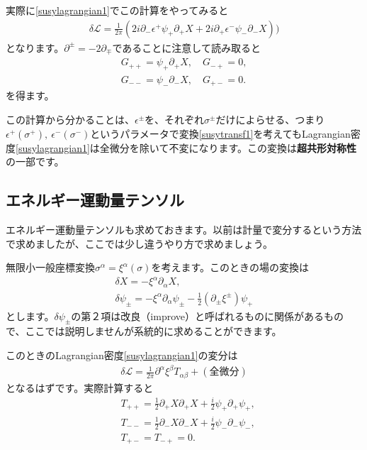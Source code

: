 \documentclass[report,paper=a4, fontsize=12pt, line_length=16cm, number_of_lines=33,dvipdfmx]{jlreq}
\numberwithin{equation}{chapter}
\numberwithin{equation}{section}
\newcommand{\del}{\partial}
\newcommand{\kyou}[1]{{\sffamily \bfseries #1}}
\newcommand{\Lcal}{\mathcal{L}}
\begin{document}
実際に\eqref{susylagrangian1}でこの計算をやってみると
\begin{align}
  \delta \Lcal = \frac{1}{2\pi}
  \left( 
    2i\del_{-}\epsilon^{+} \psi_{+}\del_{+}X +2i \del_{+}\epsilon^{-}\psi_{-}\del_{-}X
   \right))
\end{align}
となります。$\del^{\pm}=-2\del_{\mp}$であることに注意して読み取ると
\begin{align}
  G_{++}=\psi_{+}\del_{+}X,\quad G_{-+}=0,\nonumber\\
  G_{--}=\psi_{-}\del_{-}X,\quad G_{+-}=0.
\label{SUSYcurrent1}
\end{align}
を得ます。

この計算から分かることは、$\epsilon^{\pm}$を、それぞれ$\sigma^{\pm}$だけによらせる、つまり$\epsilon^{+}(\sigma^{+}),\ \epsilon^{-}(\sigma^{-})$というパラメータで変換\eqref{susytransf1}を考えてもLagrangian密度\eqref{susylagrangian1}は全微分を除いて不変になります。この変換は\kyou{超共形対称性}の一部です。

\subsection{エネルギー運動量テンソル}
エネルギー運動量テンソルも求めておきます。以前は計量で変分するという方法で求めましたが、ここでは少し違うやり方で求めましょう。

無限小一般座標変換$\sigma^{\alpha}=\xi^{\alpha}(\sigma)$を考えます。このときの場の変換は
\begin{align}
  \delta X=-\xi^{\alpha}\del_{\alpha}X,\\
  \delta \psi_{\pm}=-\xi^{\alpha}\del_{\alpha}\psi_{\pm}-\frac12(\del_{\pm}\xi^{\pm})\psi_{+}\label{susyconformaltransf}
\end{align}
とします。$\delta \psi_{\pm}$の第２項は改良（improve）と呼ばれるものに関係があるもので、ここでは説明しませんが系統的に求めることができます。

このときのLagrangian密度\eqref{susylagrangian1}の変分は
\begin{align}
  \delta \Lcal = \frac{1}{2\pi}\del^{\alpha}\xi^{\beta}T_{\alpha\beta}+(\text{全微分})
\end{align}
となるはずです。実際計算すると
\begin{align}
  &T_{++}=\frac12\del_{+}X\del_{+}X+\frac{i}{2}\psi_{+}\del_{+}\psi_{+},\nonumber\\
  &T_{--}=\frac12\del_{-}X\del_{-}X+\frac{i}{2}\psi_{-}\del_{-}\psi_{-},\nonumber\\
  &T_{+-}=T_{-+}=0.\label{EMtensorSUSYsystem}
\end{align}
\end{document}
